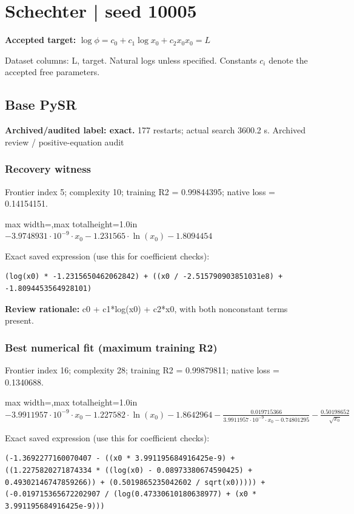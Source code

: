 \documentclass[10pt,letterpaper,landscape]{article}
\begin{document}
\section*{Schechter | seed 10005}
\textbf{Accepted target:} $\displaystyle \log\phi=c_0+c_1\log x_0+c_2x_0$\hfill $x_0=L$\par
{\small Dataset columns: L, target. Natural logs unless specified. Constants $c_i$ denote the accepted free parameters.}\par\medskip
\begin{minipage}[t]{0.485\textwidth}
\subsection*{Base PySR}
\textbf{Archived/audited label: exact.} 177 restarts; actual search 3600.2 s.
{\small Archived review / positive-equation audit}
\subsubsection*{Recovery witness}
Frontier index 5; complexity 10; training R2 = 0.99844395; native loss = 0.14154151.
\begin{center}\begin{adjustbox}{max width=\linewidth,max totalheight=1.0in}$\displaystyle - 3.9748931 \cdot 10^{-9} \cdot x_{0} - 1.231565 \cdot \ln{\left(x_{0} \right)} - 1.8094454$\end{adjustbox}\end{center}
{\scriptsize Exact saved expression (use this for coefficient checks):}
\begin{lstlisting}
(log(x0) * -1.2315650462062842) + ((x0 / -2.515790903851031e8) + -1.8094453564928101)
\end{lstlisting}
{\small\textbf{Review rationale:} c0 + c1*log(x0) + c2*x0, with both nonconstant terms present.}
\subsubsection*{Best numerical fit (maximum training R2)}
Frontier index 16; complexity 28; training R2 = 0.99879811; native loss = 0.1340688.
\begin{center}\begin{adjustbox}{max width=\linewidth,max totalheight=1.0in}$\displaystyle - 3.9911957 \cdot 10^{-9} \cdot x_{0} - 1.227582 \cdot \ln{\left(x_{0} \right)} - 1.8642964 - \frac{0.019715366}{3.9911957 \cdot 10^{-9} \cdot x_{0} - 0.74801295} - \frac{0.50198652}{\sqrt{x_{0}}}$\end{adjustbox}\end{center}
{\scriptsize Exact saved expression (use this for coefficient checks):}
\begin{lstlisting}
(-1.3692277160070407 - ((x0 * 3.991195684916425e-9) + ((1.2275820271874334 * ((log(x0) - 0.08973380674590425) + 0.49302146747859266)) + (0.5019865235042602 / sqrt(x0))))) + (-0.019715365672202907 / (log(0.47330610180638977) + (x0 * 3.991195684916425e-9)))
\end{lstlisting}
\end{minipage}\hfill
\end{document}
